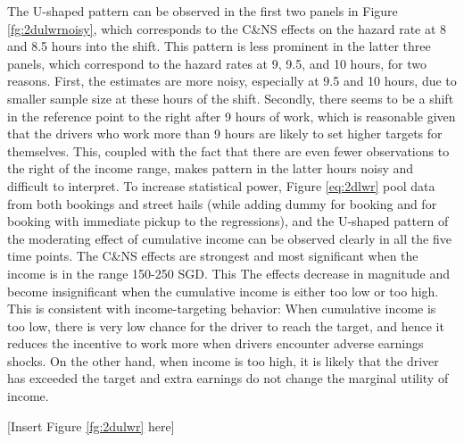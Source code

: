\documentclass[reviewmode]{restat}
\begin{document}
The U-shaped pattern can be observed in the first two panels in Figure \ref{fg:2dulwrnoisy}, which corresponds to the C\&NS effects on the hazard rate at 8 and 8.5 hours into the shift. This pattern is less prominent in the latter three panels, which correspond to the hazard rates at 9, 9.5, and 10 hours, for two reasons. First, the estimates are more noisy, especially at 9.5 and 10 hours, due to smaller sample size at these hours of the shift. Secondly, there seems to be a shift in the reference point  to the right after 9 hours of work, which is reasonable given that the drivers who work more than 9 hours are likely to set higher targets for themselves. This, coupled with the fact that there are even fewer observations to the right of the income range, makes pattern in the latter hours noisy and difficult to interpret. To increase statistical power, Figure \ref{eq:2dlwr} pool data from both bookings and street hails (while adding dummy for booking and for booking with immediate pickup to the regressions), and the U-shaped pattern of the moderating effect of cumulative income can be observed clearly in all the five time points. The C\&NS effects are strongest and most significant when the income is in the range 150-250 SGD. This  The effects decrease in magnitude and become insignificant when the cumulative income is either too low or too high. This is consistent with income-targeting behavior: When cumulative income is too low, there is very low chance for the driver to reach the target, and hence it reduces the incentive to work more when drivers encounter adverse earnings shocks. On the other hand, when income is too high, it is likely that the driver has exceeded the target and extra earnings do not change the marginal utility of income.


\begin{center}
	[Insert Figure \ref{fg:2dulwr} here]
\end{center}

\end{document}

